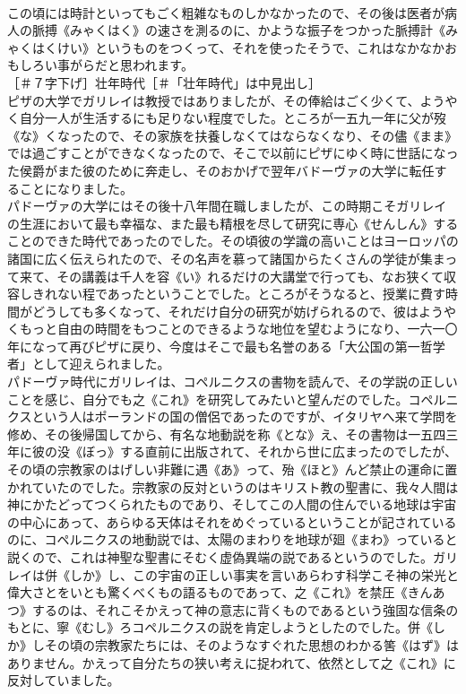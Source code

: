 \documentclass[8pt]{extreport}
\begin{document}
\begin{CJK}{UTF8}{min}
\\	この頃には時計といってもごく粗雑なものしかなかったので、その後は医者が病人の脈搏《みゃくはく》の速さを測るのに、かような振子をつかった脈搏計《みゃくはくけい》というものをつくって、それを使ったそうで、これはなかなかおもしろい事がらだと思われます。
\\	［＃７字下げ］壮年時代［＃「壮年時代」は中見出し］
\\	ピザの大学でガリレイは教授ではありましたが、その俸給はごく少くて、ようやく自分一人が生活するにも足りない程度でした。ところが一五九一年に父が歿《な》くなったので、その家族を扶養しなくてはならなくなり、その儘《まま》では過ごすことができなくなったので、そこで以前にピザにゆく時に世話になった侯爵がまた彼のために奔走し、そのおかげで翌年バドーヴァの大学に転任することになりました。
\\	パドーヴァの大学にはその後十八年間在職しましたが、この時期こそガリレイの生涯において最も幸福な、また最も精根を尽して研究に専心《せんしん》することのできた時代であったのでした。その頃彼の学識の高いことはヨーロッパの諸国に広く伝えられたので、その名声を慕って諸国からたくさんの学徒が集まって来て、その講義は千人を容《い》れるだけの大講堂で行っても、なお狭くて収容しきれない程であったということでした。ところがそうなると、授業に費す時間がどうしても多くなって、それだけ自分の研究が妨げられるので、彼はようやくもっと自由の時間をもつことのできるような地位を望むようになり、一六一〇年になって再びピザに戻り、今度はそこで最も名誉のある「大公国の第一哲学者」として迎えられました。
\\	パドーヴァ時代にガリレイは、コペルニクスの書物を読んで、その学説の正しいことを感じ、自分でも之《これ》を研究してみたいと望んだのでした。コペルニクスという人はポーランドの国の僧侶であったのですが、イタリヤへ来て学問を修め、その後帰国してから、有名な地動説を称《とな》え、その書物は一五四三年に彼の没《ぼっ》する直前に出版されて、それから世に広まったのでしたが、その頃の宗教家のはげしい非難に遇《あ》って、殆《ほと》んど禁止の運命に置かれていたのでした。宗教家の反対というのはキリスト教の聖書に、我々人間は神にかたどってつくられたものであり、そしてこの人間の住んでいる地球は宇宙の中心にあって、あらゆる天体はそれをめぐっているということが記されているのに、コペルニクスの地動説では、太陽のまわりを地球が廻《まわ》っていると説くので、これは神聖な聖書にそむく虚偽異端の説であるというのでした。ガリレイは併《しか》し、この宇宙の正しい事実を言いあらわす科学こそ神の栄光と偉大さとをいとも驚くべくもの語るものであって、之《これ》を禁圧《きんあつ》するのは、それこそかえって神の意志に背くものであるという強固な信条のもとに、寧《むし》ろコペルニクスの説を肯定しようとしたのでした。併《しか》しその頃の宗教家たちには、そのようなすぐれた思想のわかる筈《はず》はありません。かえって自分たちの狭い考えに捉われて、依然として之《これ》に反対していました。

\end{CJK}
\end{document}
